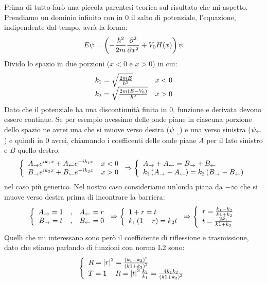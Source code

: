 Prima di tutto far\`o una piccola parentesi teorica sul risultato che mi aspetto. Prendiamo un dominio infinito con in 0 il salto di potenziale, l'equazione, indipendente dal tempo, avr\`a la forma:
\begin{equation}
	E\psi = \lrt{-\frac{\hbar^2}{2m}\pde{^2}{x^2}+V_0H(x)}\psi
\end{equation}
Divido lo spazio in due porzioni ($x<0$ e $x>0$) in cui:
\begin{equation}\label{eq:Ks}
	\begin{array}{lr}
	k_1 = \sqrt\frac{2m E}{\hbar^2}&x<0\\
	k_2 = \sqrt\frac{2m \lrt{E-V_0}}{\hbar^2}&x>0
	\end{array}
\end{equation}
Dato che il potenziale ha una discontinuit\`a finita in $0$, funzione e derivata devono essere continue. Se per esempio avessimo delle onde piane in ciascuna porzione dello spazio ne avrei una che si muove verso destra ($\psi_\to$) e una verso sinistra ($\psi_\from$) e quindi in 0 avrei, chiamando i coefficenti delle onde piane $A$ per il lato sinistro e $B$ quello destro:
\begin{equation}
	\lr\{.{\begin{array}{lr}
	A_\to e^{ik_1x} + A_\from e^{-ik_1x}	&	x<0\\
	B_\to e^{ik_2x} + B_\from e^{-ik_2x}	&	x>0
	\end{array}}\Rightarrow
	\lr\{.{\begin{array}{l}
	A_\to+A_\from = B_\to+B_\from\\
	k_1\lrt{A_\to-A_\from} = k_2\lrt{B_\to-B_\from}
	\end{array}}
\end{equation}
nel caso pi\`u generico. Nel nostro caso consideriamo un'onda piana da $-\infty$ che si muove verso destra prima di incontrare la barriera:
\begin{equation}
\lr\{.{\begin{array}{ccc}
A_\to = 1&,&
A_\from = r\\
B_\to = t&,&
B_\from=0
\end{array}} \Rightarrow\lr\{.{\begin{array}{l}
	1+r = t\\
	k_1 \lrt{1-r} = k_2 t
\end{array}} \Rightarrow\lr\{.{\begin{array}{l}
	r = \frac{k_1-k_2}{k1+k_2}\\
	t = \frac{2k_1}{k1+k_2}
\end{array}}
\end{equation}
Quelli che mi interessano sono per\`o il coefficiente di riflessione e trasmissione, dato che stiamo parlando di funzioni con norma L2 sono:
\begin{equation}
\lr\{.{\begin{array}{l}
	R = \lr||{r}^2 = \frac{\lrt{k_1-k_2}^2}{\lrt{k1+k_2}^2}\\
	T = 1-R = \lr||{t}^2\frac{k_2}{k_1} = \frac{4 k_1 k_2}{\lrt{k1+k_2}^2}
\end{array}}
\end{equation}

